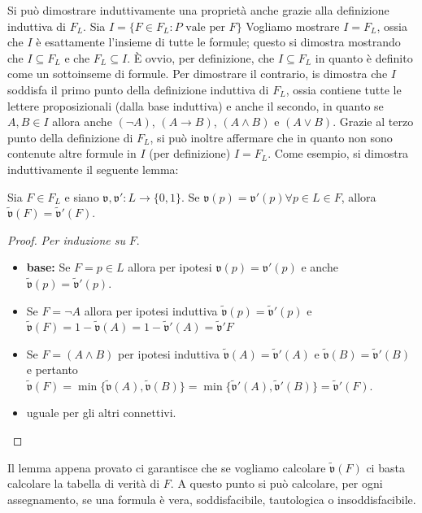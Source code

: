 Si può dimostrare induttivamente una proprietà anche grazie 
alla definizione  induttiva di $F_L$. Sia $I = \{ F \in F_L : P \text{ vale per } F\}$
Vogliamo mostrare $I = F_L$, ossia che $I$ è esattamente l'insieme di tutte le formule; 
questo si dimostra mostrando che $I \subseteq F_L$ e che $F_L \subseteq I$. 
\`E ovvio, per definizione, che $I \subseteq F_L$ in quanto è definito 
come un sottoinseme di formule. Per dimostrare il contrario, is dimostra che 
$I$ soddisfa il primo punto della definizione induttiva di $F_L$, ossia contiene 
tutte le lettere proposizionali (dalla base induttiva) e anche il secondo, in  quanto 
se $A,B \in I$ allora anche $(\neg A)$, $(A \rightarrow B)$, $(A \land B)$ e 
$(A \lor B)$. Grazie al terzo punto della definizione di $F_L$, si può inoltre affermare 
che in quanto non sono contenute altre formule in $I$ (per definizione) $I = F_L$.
Come esempio, si dimostra induttivamente il seguente lemma: 
\begin{lem}
Sia $F \in F_L$ e siano $\mathfrak{v}, \mathfrak{v}' : L \rightarrow \{0,1\}$. 
Se $\mathfrak{v}(p) = \mathfrak{v}'(p) \forall p \in L \in F$, 
allora $\widetilde{\mathfrak{v}}(F) = \widetilde{\mathfrak{v}}'(F)$.
\end{lem}
\begin{proof}
  \textit{Per induzione su } $F$. 
  \begin{itemize}
    \item \textbf{base:} Se $F = p \in L$ allora per ipotesi $\mathfrak{v}(p) = \mathfrak{v}'(p)$ e 
      anche $\widetilde{\mathfrak{v}}(p) = \widetilde{\mathfrak{v}}'(p)$.
    \item Se $F = \neg A$ allora per ipotesi induttiva 
      $\widetilde{\mathfrak{v}}(p) = \widetilde{\mathfrak{v}}'(p)$ e $\widetilde{\mathfrak{v}}(F) = 1 - 
      \widetilde{\mathfrak{v}}(A) = 1 - \widetilde{\mathfrak{v}}'(A) = \widetilde{\mathfrak{v}}'{F}$
    \item Se $F = (A \land B)$ per ipotesi induttiva $\widetilde{\mathfrak{v}}(A) = \widetilde{\mathfrak{v}}'(A)$ 
      e $\widetilde{\mathfrak{v}}(B) = \widetilde{\mathfrak{v}}'(B)$ e pertanto 
      $\widetilde{\mathfrak{v}}(F) = \min\{\widetilde{\mathfrak{v}}(A), \widetilde{\mathfrak{v}}(B)\} = 
      \min\{\widetilde{\mathfrak{v}}'(A), \widetilde{\mathfrak{v}}'(B)\} = \widetilde{\mathfrak{v}}'(F)$.
    \item uguale per gli altri connettivi.
  \end{itemize}
\end{proof}
Il lemma appena provato ci garantisce che se vogliamo calcolare $\widetilde{\mathfrak{v}}(F)$ 
ci basta calcolare la tabella di verità di $F$. A questo punto si può calcolare, 
per ogni assegnamento, se una formula è vera, soddisfacibile, tautologica o 
insoddisfacibile.

